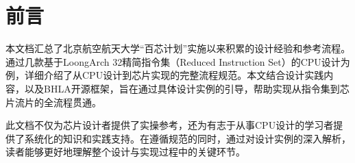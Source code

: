 
\chapter*{前言}\label{chap:00-preface}

本文档汇总了北京航空航天大学``百芯计划''实施以来积累的设计经验和参考流程。通过几款基于LoongArch 32精简指令集（Reduced Instruction Set）的CPU设计为例，详细介绍了从CPU设计到芯片实现的完整流程规范。本文结合设计实践内容，以及BHLA开源框架，旨在通过具体设计实例的引导，帮助实现从指令集到芯片流片的全流程贯通。

此文档不仅为芯片设计者提供了实操参考，还为有志于从事CPU设计的学习者提供了系统化的知识和实践支持。在遵循规范的同时，通过对设计实例的深入解析，读者能够更好地理解整个设计与实现过程中的关键环节。
